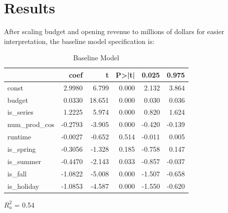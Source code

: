 \documentclass[10pt]{article}
\begin{document}
\section{Results}
After scaling budget and opening revenue to millions of dollars for easier interpretation, the baseline model specification is:

\begin{table}[H]
\centering
  \begin{threeparttable}
   \scriptsize
    \caption{Baseline Model}
	\begin{tabular}{lrrrrr}
	\toprule
	                                    & coef & t & P>|t| & 0.025 & 0.975 \\
	\midrule
	const          &       2.9980       &     6.799  &         0.000        &        2.132    &        3.864     \\
	budget         &       0.0330       &    18.651  &         0.000        &        0.030    &        0.036     \\
	is\_series     &       1.2225       &     5.974  &         0.000        &        0.820    &        1.624     \\
	num\_prod\_cos &      -0.2793       &    -3.905  &         0.000        &       -0.420    &       -0.139     \\
	runtime        &      -0.0027       &    -0.652  &         0.514        &       -0.011    &        0.005     \\
	is\_spring     &      -0.3056      &    -1.328  &         0.185        &       -0.758    &        0.147     \\
	is\_summer     &      -0.4470       &    -2.143  &         0.033        &       -0.857    &       -0.037     \\
	is\_fall       &      -1.0822      &    -5.008  &         0.000        &       -1.507    &       -0.658     \\
	is\_holiday    &      -1.0853       &    -4.587  &         0.000        &       -1.550    &       -0.620     \\
	\bottomrule
	\end{tabular}
    \begin{tablenotes}
      \scriptsize
      \item $R^2_a$ = 0.54
    \end{tablenotes}
  \end{threeparttable}    
\end{table}
\end{document}
